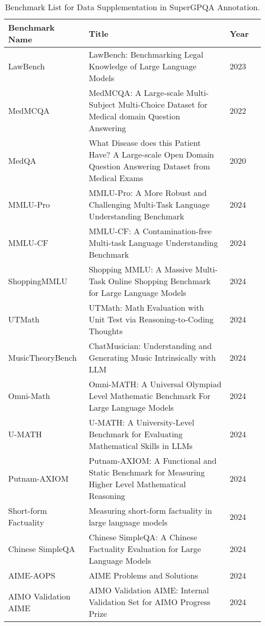\begin{longtable}{@{}p{4cm}p{9cm}p{2cm}p{1cm}@{}}

\caption{Benchmark List for Data Supplementation in SuperGPQA Annotation.}
\label{tab:benchmark}\\

\toprule
\textbf{Benchmark Name} & \textbf{Title} & \textbf{Year} \\ 
\midrule
\endfirsthead



LawBench & LawBench: Benchmarking Legal Knowledge of Large Language Models~\cite{fei2023lawbench} & 2023 \\ \midrule
MedMCQA & MedMCQA: A Large-scale Multi-Subject Multi-Choice Dataset for Medical domain Question Answering~\cite{pmlr-v174-pal22a} & 2022 \\ \midrule
MedQA & What Disease does this Patient Have? A Large-scale Open Domain Question Answering Dataset from Medical Exams~\cite{jin2020disease} & 2020 \\ \midrule
MMLU-Pro & MMLU-Pro: A More Robust and Challenging Multi-Task Language Understanding Benchmark~\cite{wang2024mmlupro} & 2024 \\ \midrule
MMLU-CF & MMLU-CF: A Contamination-free Multi-task Language Understanding Benchmark~\cite{zhao2024mmlucfcontaminationfreemultitasklanguage} & 2024 \\ \midrule
ShoppingMMLU & Shopping MMLU: A Massive Multi-Task Online Shopping Benchmark for Large Language Models~\cite{jin2024shopping} & 2024 \\ \midrule
UTMath & UTMath: Math Evaluation with Unit Test via Reasoning-to-Coding Thoughts~\cite{yang2024utmath} & 2024 \\ \midrule
MusicTheoryBench & ChatMusician: Understanding and Generating Music Intrinsically with LLM~\cite{yuan2024chatmusician} & 2024 \\ \midrule
Omni-Math & Omni-MATH: A Universal Olympiad Level Mathematic Benchmark For Large Language Models~\cite{gao2024omnimathuniversalolympiadlevel} & 2024 \\ \midrule
U-MATH & U-MATH: A University-Level Benchmark for Evaluating Mathematical Skills in LLMs~\cite{chernyshev2024umath} & 2024 \\ \midrule
\newpage
\midrule
Putnam-AXIOM & Putnam-AXIOM: A Functional and Static Benchmark for Measuring Higher Level Mathematical Reasoning~\cite{fronsdal2024putnamaxiom} & 2024 \\
\midrule

Short-form Factuality & Measuring short-form factuality in large language models~\cite{wei2024measuringshortformfactualitylarge} & 2024 \\ \midrule
Chinese SimpleQA & Chinese SimpleQA: A Chinese Factuality Evaluation for Large Language Models~\cite{he2024chinesesimpleqachinesefactuality} & 2024 \\ \midrule
AIME-AOPS & AIME Problems and Solutions~\cite{aopsAIME} & 2024 \\ \midrule
AIMO Validation AIME & AIMO Validation AIME: Internal Validation Set for AIMO Progress Prize~\cite{aimoValidationAIME} & 2024 \\ 

\bottomrule
\end{longtable}